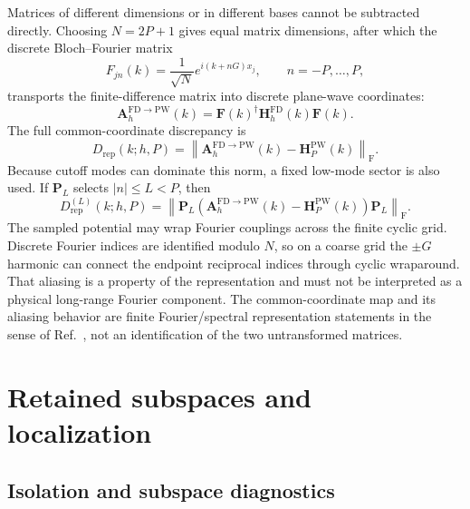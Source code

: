 Matrices of different dimensions or in different bases cannot be subtracted
directly. Choosing $N=2P+1$ gives equal matrix dimensions, after which the
discrete Bloch--Fourier matrix
\begin{equation}
    F_{jn}(k)
    =\frac{1}{\sqrt N}e^{i(k+nG)x_j},
    \qquad n=-P,\ldots,P,
\end{equation}
transports the finite-difference matrix into discrete plane-wave coordinates:
\begin{equation}
    \mathbf A_h^{\mathrm{FD}\rightarrow\mathrm{PW}}(k)
    =
    \mathbf F(k)^\dagger
    \mathbf H_h^{\mathrm{FD}}(k)
    \mathbf F(k).
\end{equation}
The full common-coordinate discrepancy is
\begin{equation}
    D_{\mathrm{rep}}(k;h,P)
    =
    \left\lVert
        \mathbf A_h^{\mathrm{FD}\rightarrow\mathrm{PW}}(k)
        -\mathbf H_P^{\mathrm{PW}}(k)
    \right\rVert_{\mathrm F}.
\end{equation}
Because cutoff modes can dominate this norm, a fixed low-mode sector is also
used. If $\mathbf P_L$ selects $|n|\leq L<P$, then
\begin{equation}
    D_{\mathrm{rep}}^{(L)}(k;h,P)
    =
    \left\lVert
        \mathbf P_L
        \left(
            \mathbf A_h^{\mathrm{FD}\rightarrow\mathrm{PW}}(k)
            -\mathbf H_P^{\mathrm{PW}}(k)
        \right)
        \mathbf P_L
    \right\rVert_{\mathrm F}.
    \label{eq:periodic-1d-common-discrepancy}
\end{equation}
The sampled potential may wrap Fourier couplings across the finite cyclic grid.
Discrete Fourier indices are identified modulo $N$, so on a coarse grid the
$\pm G$ harmonic can connect the endpoint reciprocal indices through cyclic
wraparound. That aliasing is a property of the representation and must not be
interpreted as a physical long-range Fourier component. The common-coordinate map and
its aliasing behavior are finite Fourier/spectral representation statements in the
sense of Ref.~\cite{trefethen2000}, not an identification of the two untransformed
matrices.

\section{Retained subspaces and localization}

\subsection{Isolation and subspace diagnostics}

